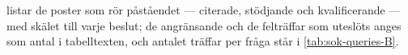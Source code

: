  listar de poster som rör påståendet
--- citerade, stödjande och kvalificerande --- med skälet till varje
beslut; de angränsande och de felträffar som uteslöts anges som antal i
tabelltexten, och antalet träffar per fråga står i
\cref{tab:sok-queries-B}.
